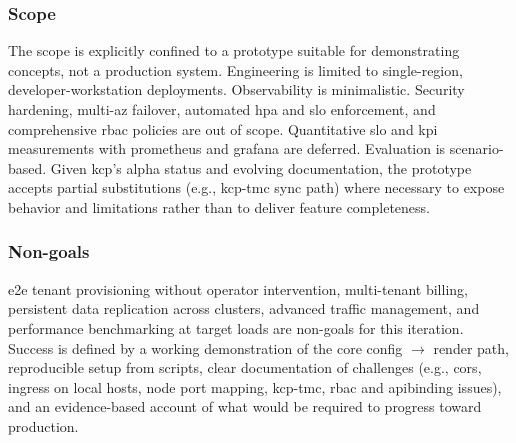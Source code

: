 \documentclass[11pt, a4paper, oneside, listof=totoc]{scrartcl}
\begin{document}
            \subsubsection{Scope}\label{subsubsec:scope}
                The scope is explicitly confined to a prototype suitable for demonstrating concepts,
                not a production system.
                Engineering is limited to single-region, developer-workstation deployments.
                Observability is minimalistic.
                Security hardening, multi-\gls{az} failover, automated \gls{hpa} and \gls{slo}
                enforcement, and comprehensive \gls{rbac} policies are out of scope.
                Quantitative \gls{slo} and \gls{kpi} measurements with \gls{prometheus} and
                \gls{grafana} are deferred.
                Evaluation is scenario-based.
                Given \gls{kcp}'s alpha status and evolving documentation, the prototype accepts
                partial substitutions (e.g., \gls{kcp}-\gls{tmc} sync path) where necessary to
                expose behavior and limitations rather than to deliver feature completeness.

            \subsubsection{Non-goals}\label{subsubsec:nongoals}
                \gls{e2e} tenant provisioning without operator intervention, multi-tenant billing,
                persistent data replication across clusters, advanced traffic management,
                and performance benchmarking at target loads are non-goals for this iteration.\\
                Success is defined by a working demonstration of the core config $\rightarrow$
                render path, reproducible setup from scripts, clear documentation of challenges
                (e.g., \gls{cors}, \gls{ingress} on local hosts, node port mapping, \gls{kcp}-\gls{tmc},
                \gls{rbac} and \gls{apibinding} issues), and an evidence-based account of what would be
                required to progress toward production.
\end{document}
